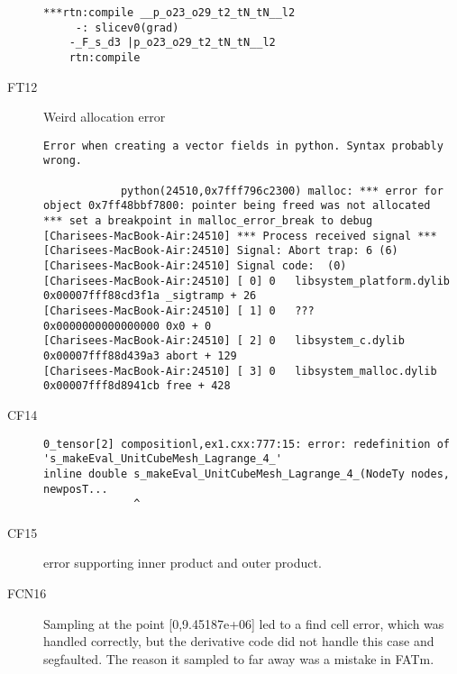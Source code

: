 \begin{description}
\begin{lstlisting}[mathescape=true]
***rtn:compile __p_o23_o29_t2_tN_tN__l2
	 -: slicev0(grad)
	-_F_s_d3 |p_o23_o29_t2_tN_tN__l2
	rtn:compile 
	\end{lstlisting}
\item[FT12]
Weird allocation error\
	    				\begin{lstlisting}[mathescape=true]
    		Error when creating a vector fields in python. Syntax probably wrong.
    		
    		python(24510,0x7fff796c2300) malloc: *** error for object 0x7ff48bbf7800: pointer being freed was not allocated
*** set a breakpoint in malloc_error_break to debug
[Charisees-MacBook-Air:24510] *** Process received signal ***
[Charisees-MacBook-Air:24510] Signal: Abort trap: 6 (6)
[Charisees-MacBook-Air:24510] Signal code:  (0)
[Charisees-MacBook-Air:24510] [ 0] 0   libsystem_platform.dylib            0x00007fff88cd3f1a _sigtramp + 26
[Charisees-MacBook-Air:24510] [ 1] 0   ???                                 0x0000000000000000 0x0 + 0
[Charisees-MacBook-Air:24510] [ 2] 0   libsystem_c.dylib                   0x00007fff88d439a3 abort + 129
[Charisees-MacBook-Air:24510] [ 3] 0   libsystem_malloc.dylib              0x00007fff8d8941cb free + 428
	\end{lstlisting}

	    		\item[CF14]
\begin{lstlisting}[mathescape=true]
	0_tensor[2] compositionl,ex1.cxx:777:15: error: redefinition of 's_makeEval_UnitCubeMesh_Lagrange_4_'
inline double s_makeEval_UnitCubeMesh_Lagrange_4_(NodeTy nodes, newposT...
              ^
	\end{lstlisting}
	
		\item[CF15]
		error supporting inner product and outer product.
              \item[FCN16] Sampling at the point [0,9.45187e+06] led to a find cell error, which was handled correctly, but the derivative code did not handle this case and segfaulted. The reason it sampled to far away was a mistake in FATm. 
\end{description}


